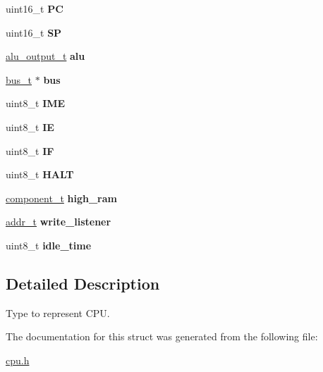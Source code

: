 \begin{DoxyCompactItemize}
\begin{tabbing}
\end{tabbing}\item 
\mbox{\label{structcpu__t_aef2cfeb77c8554030130faf43f62cc42}} 
uint16\+\_\+t {\bfseries PC}
\item 
\mbox{\label{structcpu__t_acdfeb8803d67dc28efb5742118c4f5ff}} 
uint16\+\_\+t {\bfseries SP}
\item 
\mbox{\label{structcpu__t_a0432db85b59562733878440ae5b8890b}} 
\hyperlink{structalu__output__t}{alu\+\_\+output\+\_\+t} {\bfseries alu}
\item 
\mbox{\label{structcpu__t_a11a4d60564f4b135ff6bc5d6ff2af8a9}} 
\hyperlink{bus_8h_a68c80bdf896e826e4cb082244ce35427}{bus\+\_\+t} $\ast$ {\bfseries bus}
\item 
\mbox{\label{structcpu__t_a62c6ed1910106b44dc4e92d7143e62d7}} 
uint8\+\_\+t {\bfseries I\+ME}
\item 
\mbox{\label{structcpu__t_a7e95fc3d1848dccaaff1ef20c7c2e2f3}} 
uint8\+\_\+t {\bfseries IE}
\item 
\mbox{\label{structcpu__t_a27886ad1d5b520b182093224e5bc7ea7}} 
uint8\+\_\+t {\bfseries IF}
\item 
\mbox{\label{structcpu__t_aff2f0bb1633db6f5ee65e72346791849}} 
uint8\+\_\+t {\bfseries H\+A\+LT}
\item 
\mbox{\label{structcpu__t_a04b2d240d91d7151b43bd8391b4a396f}} 
\hyperlink{structcomponent__t}{component\+\_\+t} {\bfseries high\+\_\+ram}
\item 
\mbox{\label{structcpu__t_a480b1e47c72c739e8cbaf8269f1a9122}} 
\hyperlink{memory_8h_a8a6444037e4d5cc2bf8ba22a9d9e33ca}{addr\+\_\+t} {\bfseries write\+\_\+listener}
\item 
\mbox{\label{structcpu__t_a43df13c18f25ac82fe73b188ad54f6dc}} 
uint8\+\_\+t {\bfseries idle\+\_\+time}
\end{DoxyCompactItemize}


\subsection{Detailed Description}
Type to represent C\+PU. 

The documentation for this struct was generated from the following file\+:\begin{DoxyCompactItemize}
\item 
\hyperlink{cpu_8h}{cpu.\+h}\end{DoxyCompactItemize}
